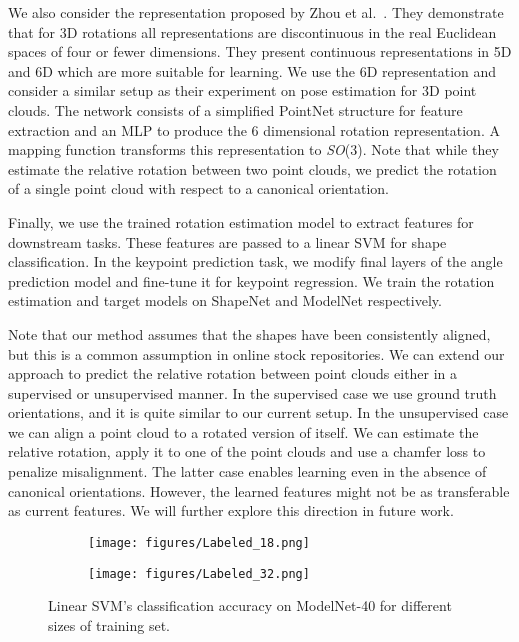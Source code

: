 \documentclass[10pt,twocolumn,letterpaper]{article}
\begin{document}
We also consider the representation proposed by Zhou et al.~\cite{zhou2019continuity}. They demonstrate that for 3D rotations all representations are discontinuous in the real Euclidean spaces of four or fewer dimensions. 
They present continuous representations in 5D and 6D which are more suitable for learning. We use the 6D representation and consider a similar setup as their experiment on pose estimation for 3D point clouds. The network consists of a simplified PointNet structure for feature extraction and an MLP to produce the 6 dimensional rotation representation. A mapping function transforms this representation to \textit{SO}(3). Note that while they estimate the relative rotation between two point clouds, we predict the rotation of a single point cloud with respect to a canonical orientation.  



Finally, we use the trained rotation estimation model to extract features for downstream tasks. These features are passed to a linear SVM for shape classification. In the keypoint prediction task, we modify final layers of the angle prediction model and fine-tune it for keypoint regression. We train the rotation estimation and target models on ShapeNet and ModelNet respectively. 


Note that our method assumes that the shapes have been consistently aligned, but this is a common assumption in online stock repositories. 
We can extend our approach to predict the relative rotation between point clouds either in a supervised or unsupervised manner. 
In the supervised case we use ground truth orientations, and it is quite similar to our current setup. In the unsupervised case we can align a point cloud to a rotated version of itself. We can estimate the relative rotation, apply it to one of the point clouds and use a chamfer loss to penalize misalignment. The latter case enables learning even in the absence of canonical orientations. However, the learned features might not be as transferable as current features. We will further explore this direction in future work.  

\begin{figure*}
\begin{center}
\begin{subfigure}{.49\textwidth}
  \centering
  \texttt{[image: figures/Labeled\_18.png]}
  \caption{}
  \label{fig:ssvm1}
\end{subfigure}
\begin{subfigure}{.49\textwidth}
  \centering
  \texttt{[image: figures/Labeled\_32.png]}
  \caption{}
  \label{fig:ssvm2}
\end{subfigure}
\end{center}
\caption{Linear SVM's classification accuracy on ModelNet-40 for different sizes of training set. }
\label{fig:portion}
\end{figure*}
\end{document}
